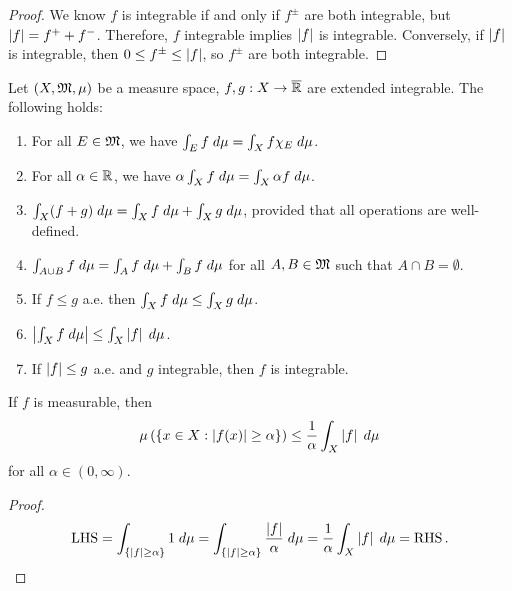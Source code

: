 \documentclass[a4paper]{article}
\begin{document}
\begin{proof}
We know $f$ is integrable if and only if $f^\pm$
are both integrable, but $\left\lvert f\right\rvert = f^+ + f^-$.
Therefore, $f$ integrable implies $\left\lvert f\right\rvert$ is integrable.
Conversely, if $\left\lvert f\right\rvert$ is integrable, then 
$0 \leq f^\pm \leq \left\lvert f\right\rvert$, so $f^\pm$ are both 
integrable.
\end{proof}

\begin{thm}
Let $(X, \mathfrak{M}, \mu)$ be a measure space, 
$f, g : X \to \overline{\mathbb{R}}$ are extended integrable. 
The following holds: 
\begin{enumerate}
  \item For all $E \in \mathfrak{M}$, we have $\int_E f \; d \mu
  = \int_X f \chi_E \; d \mu$. 
  
  \item For all $\alpha \in \mathbb{R}$, we have 
  $\alpha \int_X f \; d \mu = \int_X \alpha f \; d \mu$. 
  
  \item $\int_X (f + g) \; d \mu = \int_X f \; d \mu + 
  \int_X g \; d \mu$, provided that all operations are 
  well-defined.

  \item $\int_{A \cup B} f \; d \mu = \int_A f \; d \mu 
  + \int_B f \; d \mu$ for all $A, B \in \mathfrak{M}$ such that 
  $A \cap B = \emptyset$. 

  \item If $f \leq g$ a.e. then $\int_X f \; d \mu \leq
  \int_X g \; d \mu$.

  \item $\left\lvert \int_X f \; d \mu\right\rvert \leq \int_X \left\lvert f\right\rvert \; d \mu$.
  
  \item If $\left\lvert f\right\rvert \leq g$ a.e. and $g$ integrable, then 
  $f$ is integrable. 
\end{enumerate}
\end{thm}

\begin{thm}
If $f$ is measurable, then 
\[
\mu \left( \left\{ x \in X : \left\lvert f(x)\right\rvert \geq \alpha \right\} \right) 
\leq \frac{1}{\alpha} \int_X \left\lvert f\right\rvert \; d \mu
\]
for all $\alpha \in (0, \infty)$.
\end{thm}

\begin{proof}
\[
\begin{aligned}
  \operatorname{LHS} = \int_{\left\{ \left\lvert f\right\rvert \geq \alpha \right\}} 1 \; d \mu 
  = \int_{\left\{ \left\lvert f\right\rvert \geq \alpha \right\}} 
  \frac{\left\lvert f\right\rvert}{\alpha} \; d \mu 
  = \frac{1}{\alpha} \int_X \left\lvert f\right\rvert \; d \mu 
  = \operatorname{RHS}.
\end{aligned}
\]
\end{proof}
\end{document}
